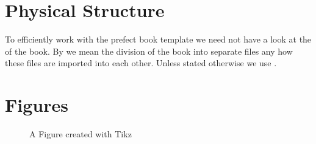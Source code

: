 \documentclass[preview,class=scrbook]{standalone}
\begin{document}
\section{Physical Structure}
To efficiently work with the prefect book template we need not have a look at
the  of the book.
By  we mean the division of the book into separate files any how these
files are imported into each other.
Unless stated otherwise we use .

\section{Figures}
\begin{figure}
	
	\caption{A Figure created with Tikz}
	\label{fig:figure1}
\end{figure}
\end{document}
